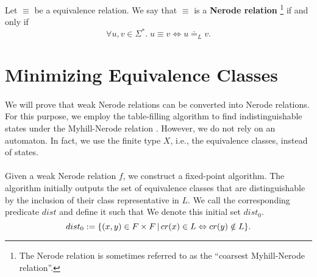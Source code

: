 \begin{definition}
    \label{Nerode_Rel}
    Let $\equiv$ be a equivalence relation. We say that $\equiv$ is a \textbf{Nerode relation}%
    \footnote{The Nerode relation is sometimes referred to as the ``coarsest Myhill-Nerode relation''.}
    if and only if
    \begin{equation*}
        \forall u, v \in \Sigma^*. \; u \equiv v \iff u \doteq_L v.
    \end{equation*}
\end{definition}












\section{Minimizing Equivalence Classes}

\paragraph{}
We will prove that weak Nerode relations can be converted into Nerode relations.
For this purpose, we employ the table-filling algorithm to find indistinguishable states under the Myhill-Nerode relation \cite{DBLP:books/daglib/0011126}.
However, we do not rely on an automaton. 
In fact, we use the finite type $X$, i.e., the equivalence classes, instead of states.

\paragraph{}
Given a weak Nerode relation $f$, we construct a fixed-point algorithm.
The algorithm initially outputs the set of equivalence classes that are distinguishable by the inclusion of their class representative in $L$. 
We call the corresponding predicate $\mathit{dist}$ and define it such that
We denote this initial set $\mathit{dist_0}$.
\begin{equation*}
    dist_0 := \{ (x,y)  \in F \times F \, | \, cr(x) \in L \Leftrightarrow cr(y) \notin L\}.
\end{equation*}


